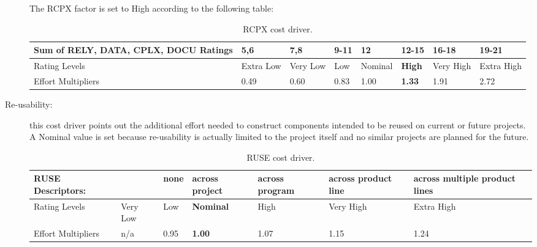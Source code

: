 \begin{description}
The RCPX factor is set to High according to the following table:

\begin{table}[H]
	\begin{adjustwidth}{-.5in}{-.5in}
    \centering
    \begin{tabular}{p{4cm}|p{1cm}|p{1cm}|p{1cm}|p{1.5cm}|p{1.2cm}|p{1cm}|p{1cm}}
        \hline
        Sum of RELY, DATA, CPLX, DOCU Ratings & 5,6 & 7,8 & 9-11 & 12 & \textbf{12-15} & 16-18 & 19-21 \\
        \hline
        \hline
        Rating Levels & Extra Low & Very Low & Low & Nominal & \textbf{High} & Very High & Extra High \\
        \hline
        Effort Multipliers & 0.49 & 0.60 & 0.83 & 1.00 & \textbf{1.33} & 1.91 & 2.72 \\
        \hline
    \end{tabular}
    \caption{RCPX cost driver.}
    \end{adjustwidth}
\end{table}

\item[Re-usability:] this cost driver points out the additional effort needed to construct components intended to be reused on current or future projects. A Nominal value is set because re-usability is actually limited to the project itself and no similar projects are planned for the future. 

\begin{table}[H]
	\begin{adjustwidth}{-.5in}{-.5in}
    \centering
    \begin{tabular}{p{3.8cm}|p{1cm}|p{1cm}|p{1.7cm}|p{1.6cm}|p{1.5cm}|p{2cm}}
    	\hline
        RUSE Descriptors: & & none & \textbf{across project} & across program & across product line & across multiple product lines \\
        \hline
        Rating Levels & Very Low & Low & \textbf{Nominal} & High & Very High & Extra High \\
        \hline
        Effort Multipliers & n/a & 0.95 & \textbf{1.00} & 1.07 & 1.15 & 1.24 \\
        \hline
    \end{tabular}
    \caption{RUSE cost driver.}
    \end{adjustwidth}
\end{table}


\end{description}
